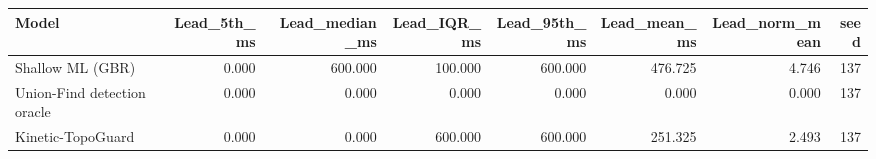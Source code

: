 \begin{tabular}{lrrrrrrr}
\toprule
Model & Lead\_5th\_ms & Lead\_median\_ms & Lead\_IQR\_ms & Lead\_95th\_ms & Lead\_mean\_ms & Lead\_norm\_mean & seed \\
\midrule
Shallow ML (GBR) & 0.000 & 600.000 & 100.000 & 600.000 & 476.725 & 4.746 & 137 \\
Union-Find detection oracle & 0.000 & 0.000 & 0.000 & 0.000 & 0.000 & 0.000 & 137 \\
Kinetic-TopoGuard & 0.000 & 0.000 & 600.000 & 600.000 & 251.325 & 2.493 & 137 \\
\bottomrule
\end{tabular}